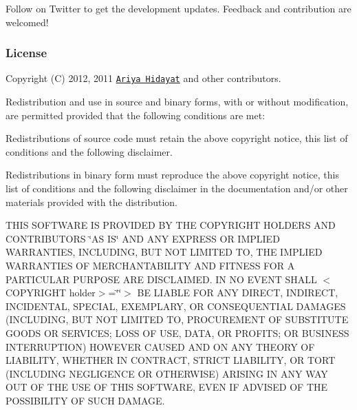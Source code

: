 Follow \href{http://twitter.com/Esprima}{\tt } on Twitter to get the development updates. Feedback and contribution are welcomed!

\subsubsection*{License}

Copyright (C) 2012, 2011 \href{http://ariya.ofilabs.com/about}{\tt Ariya Hidayat} and other contributors.

Redistribution and use in source and binary forms, with or without modification, are permitted provided that the following conditions are met\+:


\begin{DoxyItemize}
\item Redistributions of source code must retain the above copyright notice, this list of conditions and the following disclaimer.
\item Redistributions in binary form must reproduce the above copyright notice, this list of conditions and the following disclaimer in the documentation and/or other materials provided with the distribution.
\end{DoxyItemize}

T\+H\+I\+S S\+O\+F\+T\+W\+A\+R\+E I\+S P\+R\+O\+V\+I\+D\+E\+D B\+Y T\+H\+E C\+O\+P\+Y\+R\+I\+G\+H\+T H\+O\+L\+D\+E\+R\+S A\+N\+D C\+O\+N\+T\+R\+I\+B\+U\+T\+O\+R\+S \char`\"{}\+A\+S I\+S\char`\"{} A\+N\+D A\+N\+Y E\+X\+P\+R\+E\+S\+S O\+R I\+M\+P\+L\+I\+E\+D W\+A\+R\+R\+A\+N\+T\+I\+E\+S, I\+N\+C\+L\+U\+D\+I\+N\+G, B\+U\+T N\+O\+T L\+I\+M\+I\+T\+E\+D T\+O, T\+H\+E I\+M\+P\+L\+I\+E\+D W\+A\+R\+R\+A\+N\+T\+I\+E\+S O\+F M\+E\+R\+C\+H\+A\+N\+T\+A\+B\+I\+L\+I\+T\+Y A\+N\+D F\+I\+T\+N\+E\+S\+S F\+O\+R A P\+A\+R\+T\+I\+C\+U\+L\+A\+R P\+U\+R\+P\+O\+S\+E A\+R\+E D\+I\+S\+C\+L\+A\+I\+M\+E\+D. I\+N N\+O E\+V\+E\+N\+T S\+H\+A\+L\+L $<$\+C\+O\+P\+Y\+R\+I\+G\+H\+T holder$>$=\char`\"{}\char`\"{}$>$ B\+E L\+I\+A\+B\+L\+E F\+O\+R A\+N\+Y D\+I\+R\+E\+C\+T, I\+N\+D\+I\+R\+E\+C\+T, I\+N\+C\+I\+D\+E\+N\+T\+A\+L, S\+P\+E\+C\+I\+A\+L, E\+X\+E\+M\+P\+L\+A\+R\+Y, O\+R C\+O\+N\+S\+E\+Q\+U\+E\+N\+T\+I\+A\+L D\+A\+M\+A\+G\+E\+S (I\+N\+C\+L\+U\+D\+I\+N\+G, B\+U\+T N\+O\+T L\+I\+M\+I\+T\+E\+D T\+O, P\+R\+O\+C\+U\+R\+E\+M\+E\+N\+T O\+F S\+U\+B\+S\+T\+I\+T\+U\+T\+E G\+O\+O\+D\+S O\+R S\+E\+R\+V\+I\+C\+E\+S; L\+O\+S\+S O\+F U\+S\+E, D\+A\+T\+A, O\+R P\+R\+O\+F\+I\+T\+S; O\+R B\+U\+S\+I\+N\+E\+S\+S I\+N\+T\+E\+R\+R\+U\+P\+T\+I\+O\+N) H\+O\+W\+E\+V\+E\+R C\+A\+U\+S\+E\+D A\+N\+D O\+N A\+N\+Y T\+H\+E\+O\+R\+Y O\+F L\+I\+A\+B\+I\+L\+I\+T\+Y, W\+H\+E\+T\+H\+E\+R I\+N C\+O\+N\+T\+R\+A\+C\+T, S\+T\+R\+I\+C\+T L\+I\+A\+B\+I\+L\+I\+T\+Y, O\+R T\+O\+R\+T (I\+N\+C\+L\+U\+D\+I\+N\+G N\+E\+G\+L\+I\+G\+E\+N\+C\+E O\+R O\+T\+H\+E\+R\+W\+I\+S\+E) A\+R\+I\+S\+I\+N\+G I\+N A\+N\+Y W\+A\+Y O\+U\+T O\+F T\+H\+E U\+S\+E O\+F T\+H\+I\+S S\+O\+F\+T\+W\+A\+R\+E, E\+V\+E\+N I\+F A\+D\+V\+I\+S\+E\+D O\+F T\+H\+E P\+O\+S\+S\+I\+B\+I\+L\+I\+T\+Y O\+F S\+U\+C\+H D\+A\+M\+A\+G\+E. 